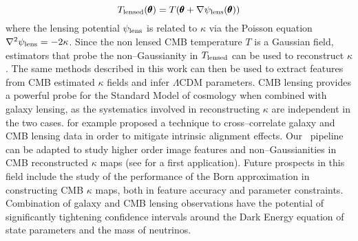 \begin{equation}
\label{eq:8:tlens}
T_{\rm lensed}(\pmb{\theta}) = T(\pmb{\theta} + \nabla \psi_{\rm lens}(\pmb{\theta}))
\end{equation} 
%
where the lensing potential $\psi_{\rm lens}$ is related to $\kappa$ via the Poisson equation $\nabla^2\psi_{\rm lens}=-2\kappa$. Since the non lensed CMB temperature $T$ is a Gaussian field, estimators that probe the non--Gaussianity in $T_{\rm lensed}$ can be used to reconstruct $\kappa$ \citep{CMBLens}. The same methods described in this work can then be used to extract features from CMB estimated $\kappa$ fields and infer $\Lambda$CDM parameters. CMB lensing provides a powerful probe for the Standard Model of cosmology when combined with galaxy lensing, as the systematics involved in reconstructing $\kappa$ are independent in the two cases. \citep{CMBIA} for example proposed a technique to cross--correlate galaxy and CMB lensing data in order to mitigate intrinsic alignment effects. Our \LT\, pipeline can be adapted to study higher order image features and non--Gaussianities in CMB reconstructed $\kappa$ maps (see \citep{PetriCMB} for a first application). Future prospects in this field include the study of the performance of the Born approximation in constructing CMB $\kappa$ maps, both in feature accuracy \citep{CMBCalabrese,CMBPrattenLewis} and parameter constraints. Combination of galaxy and CMB lensing observations have the potential of significantly tightening confidence intervals around the Dark Energy equation of state parameters and the mass of neutrinos.   


